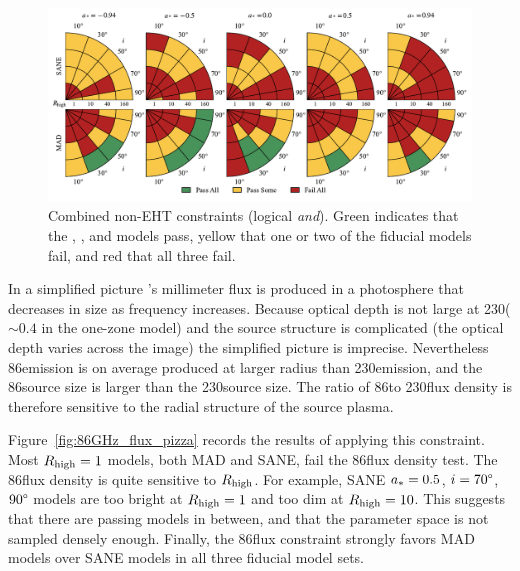 \begin{figure}
  \centering
  \includegraphics[width=\textwidth]{./figures/Non_Interferometric_Constraints.pdf}
  \caption{Combined non-EHT constraints (logical {\em and}).
    Green indicates that the \kharma, \bhac, and \hamr models pass, yellow that one or two of the fiducial models fail, and red that all three fail.}
  \label{fig:non_eht_cuts}
\end{figure}


In a simplified picture \sgra's millimeter flux is produced in a photosphere that decreases in size as frequency increases.
Because optical depth is not large at 230\GHz ($\sim 0.4$ in the one-zone model) and the source structure is complicated (the optical depth varies across the image) the simplified picture is imprecise.
Nevertheless 86\GHz emission is on average produced at larger radius than 230\GHz emission, and the 86\GHz source size is larger than the 230\GHz source size.  The ratio of 86\GHz to 230\GHz flux density is therefore sensitive to the radial structure of the source plasma.

Figure~\ref{fig:86GHz_flux_pizza} records the results of applying this constraint.
Most $R_\mathrm{high} = 1$ models, both MAD and SANE, fail the 86\GHz flux density test.
The 86\GHz flux density is quite sensitive to $R_\mathrm{high}$.
For example, SANE $a_* = 0.5$, $i = 70\degree$, $90\degree$ models are too bright at $R_\mathrm{high} = 1$ and too dim at $R_\mathrm{high} = 10$.  This suggests that there are passing models in between, and that the parameter space is not sampled densely enough.
Finally, the 86\GHz flux constraint strongly favors MAD models over SANE models in all three fiducial model sets.


